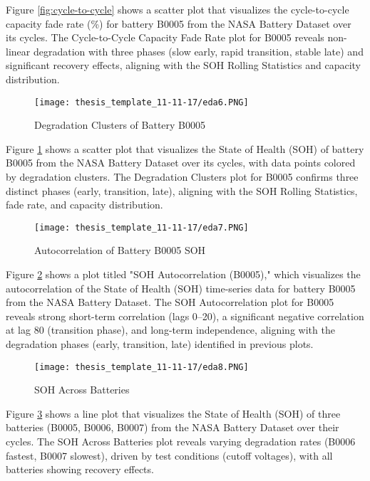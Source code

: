 Figure \ref{fig:cycle-to-cycle} shows a scatter plot that visualizes the cycle-to-cycle capacity fade rate (\%) for battery B0005 from the NASA Battery Dataset over its cycles. The Cycle-to-Cycle Capacity Fade Rate plot for B0005 reveals non-linear degradation with three phases (slow early, rapid transition, stable late) and significant recovery effects, aligning with the SOH Rolling Statistics and capacity distribution.

\begin{figure}
    \centering
    \texttt{[image: thesis\_template\_11-11-17/eda6.PNG]}
    \caption{Degradation Clusters of Battery B0005}
    \label{fig:degclusters}
\end{figure}

Figure \ref{fig:degclusters} shows a scatter plot that visualizes the State of Health (SOH) of battery B0005 from the NASA Battery Dataset over its cycles, with data points colored by degradation clusters. The Degradation Clusters plot for B0005 confirms three distinct phases (early, transition, late), aligning with the SOH Rolling Statistics, fade rate, and capacity distribution.

\begin{figure}
    \centering
    \texttt{[image: thesis\_template\_11-11-17/eda7.PNG]}
    \caption{Autocorrelation of Battery B0005 SOH}
    \label{fig:autocor}
\end{figure}

Figure \ref{fig:autocor} shows a plot titled "SOH Autocorrelation (B0005)," which visualizes the autocorrelation of the State of Health (SOH) time-series data for battery B0005 from the NASA Battery Dataset. The SOH Autocorrelation plot for B0005 reveals strong short-term correlation (lags 0–20), a significant negative correlation at lag 80 (transition phase), and long-term independence, aligning with the degradation phases (early, transition, late) identified in previous plots.

\begin{figure}
    \centering
    \texttt{[image: thesis\_template\_11-11-17/eda8.PNG]}
    \caption{SOH Across Batteries}
    \label{fig:batteriesSOH}
\end{figure}

Figure \ref{fig:batteriesSOH} shows a line plot that visualizes the State of Health (SOH) of three batteries (B0005, B0006, B0007) from the NASA Battery Dataset over their cycles. The SOH Across Batteries plot reveals varying degradation rates (B0006 fastest, B0007 slowest), driven by test conditions (cutoff voltages), with all batteries showing recovery effects.

